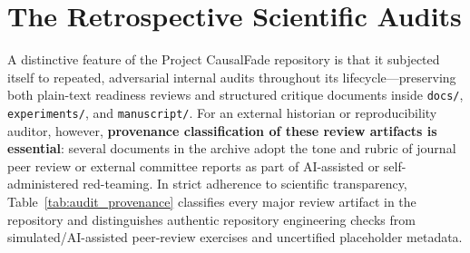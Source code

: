 \chapter{The Retrospective Scientific Audits}\label{ch:audits}

A distinctive feature of the Project CausalFade repository is that it subjected itself to repeated, adversarial internal audits throughout its lifecycle---preserving both plain-text readiness reviews and structured critique documents inside \texttt{docs/}, \texttt{experiments/}, and \texttt{manuscript/}. For an external historian or reproducibility auditor, however, \textbf{provenance classification of these review artifacts is essential}: several documents in the archive adopt the tone and rubric of journal peer review or external committee reports as part of AI-assisted or self-administered red-teaming. In strict adherence to scientific transparency, Table~\ref{tab:audit_provenance} classifies every major review artifact in the repository and distinguishes authentic repository engineering checks from simulated/AI-assisted peer-review exercises and uncertified placeholder metadata.

